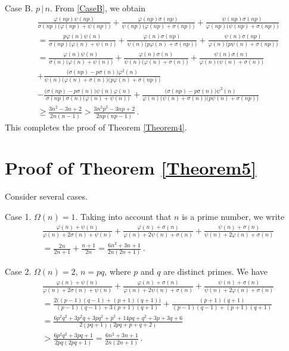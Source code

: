 \documentclass[12pt]{article}
\begin{document}
Case B. \;  $p\,|\,n$. From \eqref{CaseB}, we obtain
\begin{align*}
&\frac{\varphi(np)\psi(np)}{\sigma(np)\big(\varphi(np)+\psi(np)\big)}+\frac{\varphi(np)\sigma(np)}{\psi(np)\big(\varphi(np)+\sigma(np)\big)}+\frac{\psi(np)\sigma(np)}{\varphi(np)\big(\psi(np)+\sigma(np)\big)}\\
&=\frac{p\varphi(n)\psi(n)}{\sigma(np)\big(\varphi(n)+\psi(n)\big)}+\frac{\varphi(n)\sigma(np)}{\psi(n)\big(p\varphi(n)+\sigma(np)\big)}+\frac{\psi(n)\sigma(np)}{\varphi(n)\big(p\psi(n)+\sigma(np)\big)}\\
&=\frac{\varphi(n)\psi(n)}{\sigma(n)\big(\varphi(n)+\psi(n)\big)}+\frac{\varphi(n)\sigma(n)}{\psi(n)\big(\varphi(n)+\sigma(n)\big)}+\frac{\psi(n)\sigma(n)}{\varphi(n)\big(\psi(n)+\sigma(n)\big)}\\
&+\frac{\big(\sigma(np)-p\sigma(n)\big)\varphi^2(n)}{\psi(n)\big(\varphi(n)+\sigma(n)\big)\big(p\varphi(n)+\sigma(np)\big)}\\
&-\frac{\big(\sigma(np)-p\sigma(n)\big)\psi(n)\varphi(n)}{\sigma(np)\sigma(n)\big(\varphi(n)+\psi(n)\big)}
+\frac{\big(\sigma(np)-p\sigma(n)\big)\psi^2(n)}{\varphi(n)\big(\psi(n)+\sigma(n)\big)\big(p\psi(n)+\sigma(np)\big)}\\
&\geq\frac{3n^2-3n+2}{2n(n-1)}>\frac{3n^2p^2-3np+2}{2np(np-1)}\,.
\end{align*}
This completes the proof of Theorem \ref{Theorem4}.


\section{Proof of Theorem \ref{Theorem5}}

Consider several cases.

Case 1. \; $\Omega(n)=1$. Taking into account that $n$ is a prime number, we write
\begin{align*}
&\frac{\varphi(n)+\psi(n)}{\varphi(n)+2\sigma(n)+\psi(n)}+\frac{\varphi(n)+\sigma(n)}{\varphi(n)+2\psi(n)+\sigma(n)}+\frac{\psi(n)+\sigma(n)}{\psi(n)+2\varphi(n)+\sigma(n)}\\
&=\frac{2n}{2n+1}+\frac{n+1}{2n}=\frac{6n^2+3n+1}{2n(2n+1)}\,.
\end{align*}

Case 2. \; $\Omega(n)=2$, $n=pq$, where $p$ and $q$ are distinct primes. We have
\begin{align*}
&\frac{\varphi(n)+\psi(n)}{\varphi(n)+2\sigma(n)+\psi(n)}+\frac{\varphi(n)+\sigma(n)}{\varphi(n)+2\psi(n)+\sigma(n)}+\frac{\psi(n)+\sigma(n)}{\psi(n)+2\varphi(n)+\sigma(n)}\\
&=\frac{2\big((p-1)(q-1)+(p+1)(q+1)\big)}{(p-1)(q-1)+3(p+1)(q+1)}+\frac{(p+1)(q+1)}{(p-1)(q-1)+(p+1)(q+1)}\\ 
&=\frac{6p^2q^2+3p^2q+3pq^2+p^2+14pq+q^2+3p+3q+6}{2(pq+1)(2pq+p+q+2)}\\
&>\frac{6p^2q^2+3pq+1}{2pq(2pq+1)}=\frac{6n^2+3n+1}{2n(2n+1)}\,.
\end{align*}
\end{document}
